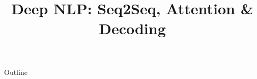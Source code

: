 \documentclass[xcolor=dvipsnames,compress,t,pdf]{beamer}
\title[\insertframenumber /\inserttotalframenumber]{Deep NLP: Seq2Seq, Attention \& Decoding}
\begin{document}
	\begin{frame}
	\titlepage
	\end{frame}

	\begin{frame}{Outline}
	    \tableofcontents
	\end{frame}

	
	
	
\end{document}

